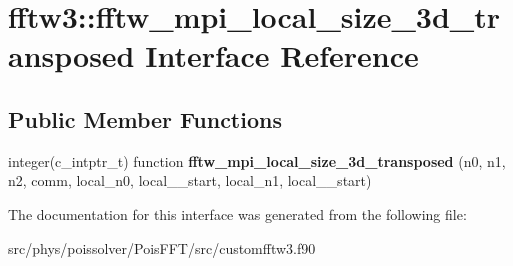 \hypertarget{interfacefftw3_1_1fftw__mpi__local__size__3d__transposed}{}\section{fftw3\+:\+:fftw\+\_\+mpi\+\_\+local\+\_\+size\+\_\+3d\+\_\+transposed Interface Reference}
\label{interfacefftw3_1_1fftw__mpi__local__size__3d__transposed}
\subsection*{Public Member Functions}
\begin{DoxyCompactItemize}
\item 
integer(c\+\_\+intptr\+\_\+t) function {\bfseries fftw\+\_\+mpi\+\_\+local\+\_\+size\+\_\+3d\+\_\+transposed} (n0, n1, n2, comm, local\+\_\+n0, local\+\_\+\_\+start, local\+\_\+n1, local\+\_\+\_\+start)\hypertarget{interfacefftw3_1_1fftw__mpi__local__size__3d__transposed_a113c58bea75b1862fd0582552a20159d}{}\label{interfacefftw3_1_1fftw__mpi__local__size__3d__transposed_a113c58bea75b1862fd0582552a20159d}

\end{DoxyCompactItemize}


The documentation for this interface was generated from the following file\+:\begin{DoxyCompactItemize}
\item 
src/phys/poissolver/\+Pois\+F\+F\+T/src/customfftw3.\+f90\end{DoxyCompactItemize}
